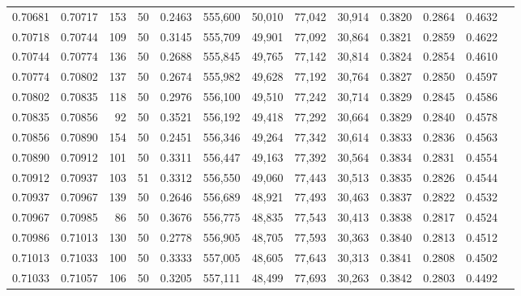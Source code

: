 \begin{tabular}{rrrrrrrrrrrrr}
0.70681 & 0.70717 &   153 &  50 &                                     0.2463 & 555,600 &  50,010 &  77,042 &  30,914 & 0.3820 & 0.2864 & 0.4632 \\
0.70718 & 0.70744 &   109 &  50 &                                     0.3145 & 555,709 &  49,901 &  77,092 &  30,864 & 0.3821 & 0.2859 & 0.4622 \\
0.70744 & 0.70774 &   136 &  50 &                                     0.2688 & 555,845 &  49,765 &  77,142 &  30,814 & 0.3824 & 0.2854 & 0.4610 \\
0.70774 & 0.70802 &   137 &  50 &                                     0.2674 & 555,982 &  49,628 &  77,192 &  30,764 & 0.3827 & 0.2850 & 0.4597 \\
0.70802 & 0.70835 &   118 &  50 &                                     0.2976 & 556,100 &  49,510 &  77,242 &  30,714 & 0.3829 & 0.2845 & 0.4586 \\
0.70835 & 0.70856 &    92 &  50 &                                     0.3521 & 556,192 &  49,418 &  77,292 &  30,664 & 0.3829 & 0.2840 & 0.4578 \\
0.70856 & 0.70890 &   154 &  50 &                                     0.2451 & 556,346 &  49,264 &  77,342 &  30,614 & 0.3833 & 0.2836 & 0.4563 \\
0.70890 & 0.70912 &   101 &  50 &                                     0.3311 & 556,447 &  49,163 &  77,392 &  30,564 & 0.3834 & 0.2831 & 0.4554 \\
0.70912 & 0.70937 &   103 &  51 &                                     0.3312 & 556,550 &  49,060 &  77,443 &  30,513 & 0.3835 & 0.2826 & 0.4544 \\
0.70937 & 0.70967 &   139 &  50 &                                     0.2646 & 556,689 &  48,921 &  77,493 &  30,463 & 0.3837 & 0.2822 & 0.4532 \\
0.70967 & 0.70985 &    86 &  50 &                                     0.3676 & 556,775 &  48,835 &  77,543 &  30,413 & 0.3838 & 0.2817 & 0.4524 \\
0.70986 & 0.71013 &   130 &  50 &                                     0.2778 & 556,905 &  48,705 &  77,593 &  30,363 & 0.3840 & 0.2813 & 0.4512 \\
0.71013 & 0.71033 &   100 &  50 &                                     0.3333 & 557,005 &  48,605 &  77,643 &  30,313 & 0.3841 & 0.2808 & 0.4502 \\
0.71033 & 0.71057 &   106 &  50 &                                     0.3205 & 557,111 &  48,499 &  77,693 &  30,263 & 0.3842 & 0.2803 & 0.4492 \\

\end{tabular}
